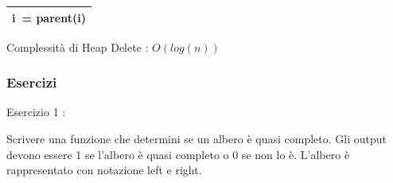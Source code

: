 \documentclass{article}
\begin{document}
\begin{longtable}[]{@{}l@{}}
\begin{minipage}[t]{0.97\columnwidth}
{\hspace*{0.333em}\hspace*{0.333em}\hspace*{0.333em}\hspace*{0.333em}\hspace*{0.333em}\hspace*{0.333em}\hspace*{0.333em}\hspace*{0.333em}\hspace*{0.333em}\hspace*{0.333em}\hspace*{0.333em}\hspace*{0.333em}\hspace*{0.333em}\hspace*{0.333em}\hspace*{0.333em}\hspace*{0.333em}\hspace*{0.333em}\hspace*{0.333em}\hspace*{0.333em}\hspace*{0.333em}\hspace*{0.333em}\hspace*{0.333em}\hspace*{0.333em}\hspace*{0.333em}\hspace*{0.333em}\hspace*{0.333em}\hspace*{0.333em}\hspace*{0.333em}\hspace*{0.333em}\hspace*{0.333em}\hspace*{0.333em}\hspace*{0.333em}}{i}{~=
parent(}{i}{)}\strut
\end{minipage}\tabularnewline
\bottomrule
\end{longtable}

{Complessità di Heap Delete : }$O(log(n))$

{}

\hypertarget{h.r8bopy9q4g8f}{\subsubsection{\texorpdfstring{{Esercizi}}{Esercizi}}\label{h.r8bopy9q4g8f}}

{Esercizio 1 }{: }

{Scrivere una funzione che determini se un albero è quasi completo. Gli
output devono essere 1 se l'albero è quasi completo o 0 se non lo è.
}{L'albero è rappresentato con notazione left e right}{.}
\end{document}
